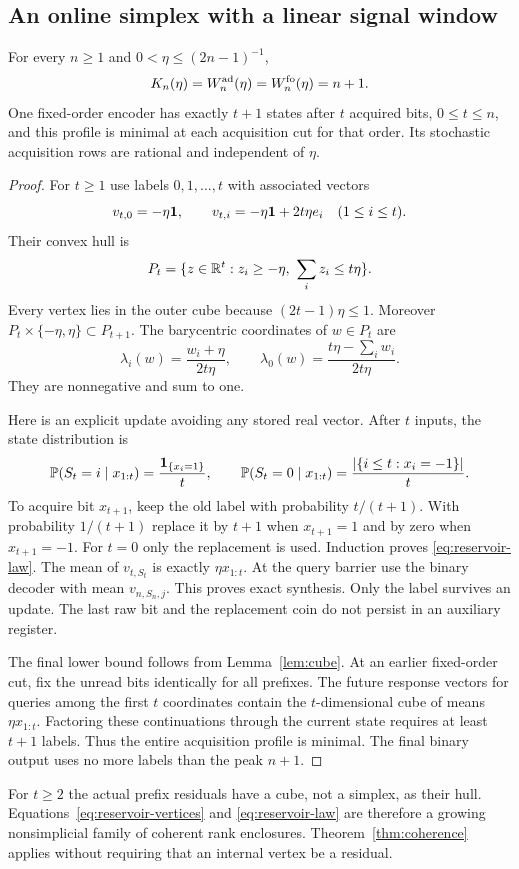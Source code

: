 \subsection{An online simplex with a linear signal window}
\begin{theorem}
\label{thm:reservoir}
For every $n\ge1$ and $0<\eta\le(2n-1)^{-1}$,
\begin{equation}\label{eq:reservoir-peak}
       K_n(\eta)=W_n^{\rm ad}(\eta)=W_n^{\rm fo}(\eta)=n+1.
\end{equation}
One fixed-order encoder has exactly $t+1$ states after $t$ acquired
bits, $0\le t\le n$, and this profile is minimal at each acquisition
cut for that order. Its stochastic acquisition rows are rational and
independent of $\eta$.
\end{theorem}
\begin{proof}
For $t\ge1$ use labels $0,1,\ldots,t$ with associated vectors
\begin{equation}\label{eq:reservoir-vertices}
 v_{t,0}=-\eta\mathbf1,
 \qquad v_{t,i}=-\eta\mathbf1+2t\eta e_i\quad(1\le i\le t).
\end{equation}
Their convex hull is
\[
 P_t=\{z\in\R^t:z_i\ge-\eta,\ \sum_i z_i\le t\eta\}.
\]
Every vertex lies in the outer cube because $(2t-1)\eta\le1$.
Moreover $P_t\times\{-\eta,\eta\}\subset P_{t+1}$. The barycentric
coordinates of $w\in P_t$ are
\[
 \lambda_i(w)=\frac{w_i+\eta}{2t\eta},\qquad
 \lambda_0(w)=\frac{t\eta-\sum_iw_i}{2t\eta}.
\]
They are nonnegative and sum to one.

Here is an explicit update avoiding any stored real vector. After $t$
inputs, the state distribution is
\begin{equation}\label{eq:reservoir-law}
 \mathbb P(S_t=i\mid x_{1:t})=\frac{\mathbf1_{\{x_i=1\}}}{t},
 \qquad
 \mathbb P(S_t=0\mid x_{1:t})=\frac{|\{i\le t:x_i=-1\}|}{t}.
\end{equation}
To acquire bit $x_{t+1}$, keep the old label with probability $t/(t+1)$.
With probability $1/(t+1)$ replace it by $t+1$ when $x_{t+1}=1$ and
by zero when $x_{t+1}=-1$. For $t=0$ only the replacement is used.
Induction proves \eqref{eq:reservoir-law}. The mean of
$v_{t,S_t}$ is exactly $\eta x_{1:t}$. At the query barrier use the
binary decoder with mean $v_{n,S_n,j}$. This proves exact synthesis.
Only the label survives an update. The last raw bit and the replacement
coin do not persist in an auxiliary register.

The final lower bound follows from Lemma~\ref{lem:cube}. At an earlier
fixed-order cut, fix the unread bits identically for all prefixes.
The future response vectors for queries among the first $t$ coordinates
contain the $t$-dimensional cube of means $\eta x_{1:t}$. Factoring
these continuations through the current state requires at least $t+1$
labels. Thus the entire acquisition profile is minimal. The final binary
output uses no more labels than the peak $n+1$.
\end{proof}
For $t\ge2$ the actual prefix residuals have a cube, not a simplex,
as their hull. Equations~\eqref{eq:reservoir-vertices} and
\eqref{eq:reservoir-law} are therefore a growing nonsimplicial family
of coherent rank enclosures. Theorem~\ref{thm:coherence} applies without
requiring that an internal vertex be a residual.

